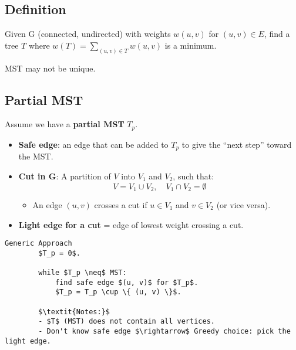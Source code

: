 \subsection{Definition}
\begin{definition}
    Given G (connected, undirected) with weights $w(u,v)$ for $(u,v) \in E$, find a tree $T$ where $w(T) = \sum_{(u,v) \in T} w(u,v)$ is a minimum. 
\end{definition}

\begin{warning}
    MST may not be unique.
\end{warning}

\subsection{Partial MST}
\begin{intuition}
    Assume we have a \textbf{partial MST} \( T_p \).
    \begin{itemize}
        \item \textbf{Safe edge}: an edge that can be added to \( T_p \) to give the ``next step'' toward the MST.

        \item \textbf{Cut in G}: A partition of \( V \) into \( V_1 \) and \( V_2 \), such that:
        \[
        V = V_1 \cup V_2, \quad V_1 \cap V_2 = \emptyset
        \]
    
        \begin{itemize}
            \item An edge \( (u, v) \) crosses a cut if \( u \in V_1 \) and \( v \in V_2 \) (or vice versa).
        \end{itemize}
        \item \textbf{Light edge for a cut} = edge of lowest weight crossing a cut.
    \end{itemize}

    \begin{lstlisting}[mathescape]
        Generic Approach 
        $T_p = 0$.
        
        while $T_p \neq$ MST:
            find safe edge $(u, v)$ for $T_p$.
            $T_p = T_p \cup \{ (u, v) \}$.
        
        $\textit{Notes:}$
        - $T$ (MST) does not contain all vertices.
        - Don't know safe edge $\rightarrow$ Greedy choice: pick the light edge.
        \end{lstlisting}        
\end{intuition}

